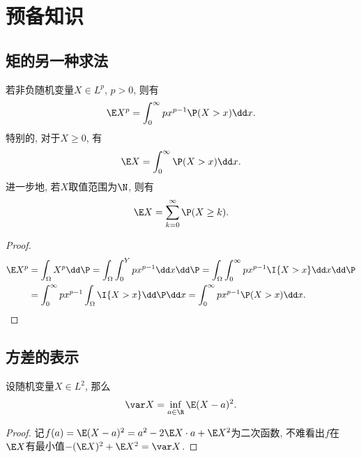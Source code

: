\section{预备知识}

\subsection{矩的另一种求法}

\begin{lemma}\label{lemma:trickOfExpectation}
	若非负随机变量$X \in L^p$, $p > 0$, 则有
	\begin{equation}
		\E X^p = \int_0^{\infty} p x^{p-1} \P(X > x) \dd x. 
	\end{equation}
	特别的, 对于$X \geq 0$, 有
	\begin{equation*}
		\E X = \int_0^{\infty} \P(X > x) \dd x. 
	\end{equation*}
	进一步地, 若$X$取值范围为$\N$, 则有
	\begin{equation*}
		\E X = \sum_{k=0}^{\infty} \P(X \geq k). 
	\end{equation*}
\end{lemma}
\begin{proof}
	\begin{align*}
		\E X^p 
		&= \int_\Omega X^p \dd \P 
		= \int_\Omega \int_0^Y p x^{p-1} \dd x \dd \P 
		= \int_\Omega \int_0^{\infty} p x^{p-1} \I{X > x} \dd x \dd \P \\
		&= \int_0^{\infty} p x^{p-1} \int_\Omega \I{X > x} \dd \P \dd x
		= \int_0^{\infty} p x^{p-1} \P(X > x) \dd x.
	\end{align*}
\end{proof}

\begin{theorem}[Rademacher]
	
\end{theorem}

\subsection{方差的表示}

\begin{lemma}[方差的变分表示]
	设随机变量$X \in L^2$, 那么
	\begin{equation*}
		\var X = \inf_{a \in \R} \E (X - a)^2. 
	\end{equation*}
\end{lemma}
\begin{proof}
	记$f(a) =  \E (X - a)^2 = a^2 - 2 \E X \cdot a + \E X^2$为二次函数, 不难看出$f$在$\E X$有最小值$- (\E X)^2 + \E X^2 = \var X$. 
\end{proof}

